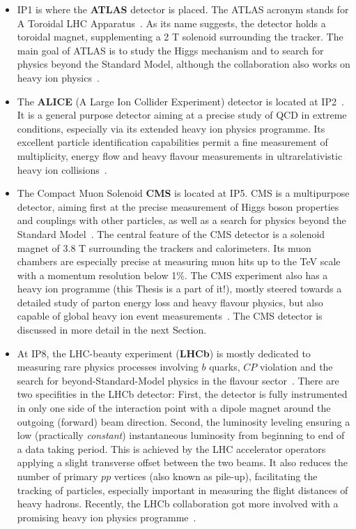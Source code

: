 \begin{itemize}
\item[] IP1 is where the \textbf{ATLAS} detector is placed. The ATLAS acronym
  stands for A Toroidal LHC Apparatus~\cite{Aad:2008zzm}. As its name
  suggests, the detector holds a toroidal magnet, supplementing a 2 T solenoid
  surrounding the tracker. The main goal of ATLAS is to study the
  Higgs mechanism and to search for physics beyond the Standard Model,
  although the collaboration also works on heavy ion
  physics~\cite{atlasHI}.
\item[] The \textbf{ALICE} (A Large Ion Collider Experiment) detector
  is located at IP2~\cite{Aamodt:2008zz}. It is a general purpose
  detector aiming at a precise study of QCD in extreme conditions,
  especially via its extended heavy ion physics programme. Its excellent
  particle identification capabilities permit a fine measurement of multiplicity, energy flow and heavy flavour measurements in ultrarelativistic heavy ion
  collisions~\cite{ALICE}.
\item[] The Compact Muon Solenoid \textbf{CMS} is located at IP5. CMS
  is a multipurpose detector, aiming first at the precise measurement
  of Higgs boson properties and couplings with other particles, as
  well as a search for physics beyond the Standard
  Model~\cite{Chatrchyan:2008aa}. The central feature of the CMS
  detector is a solenoid magnet of 3.8 T surrounding the trackers and
  calorimeters. Its muon chambers are especially precise at measuring
  muon hits up to the TeV scale with a momentum resolution below
  1\%. The CMS experiment also has a heavy ion programme (this Thesis
  is a part of it!), mostly steered towards a detailed study of parton
  energy loss and heavy flavour physics, but also capable of global
  heavy ion event measurements~\cite{CMSHI}. The CMS detector is
  discussed in more detail in the next Section.
\item[] At IP8, the LHC-beauty experiment (\textbf{LHCb}) is mostly
  dedicated to measuring rare physics processes involving $b$ quarks, $CP$ violation
  and the search for beyond-Standard-Model physics in the flavour
  sector~\cite{Alves:2008zz}. There are two specifities in the LHCb
  detector:
  First, the detector is fully instrumented in only one side of the
  interaction point with a dipole magnet around the outgoing (forward)
  beam direction. Second, the luminosity leveling ensuring a low
  (practically \textit{constant}) instantaneous luminosity from
  beginning to end of a data taking period. This is achieved by the
  LHC accelerator operators applying a slight transverse offset
  between the two beams. It also reduces the number of primary $pp$
  vertices (also known as pile-up), facilitating the tracking of
  particles, especially important in measuring the flight distances of
  heavy hadrons. Recently, the LHCb collaboration got more involved
  with a promising heavy ion physics programme~\cite{Jing:1757559}.
\end{itemize}


